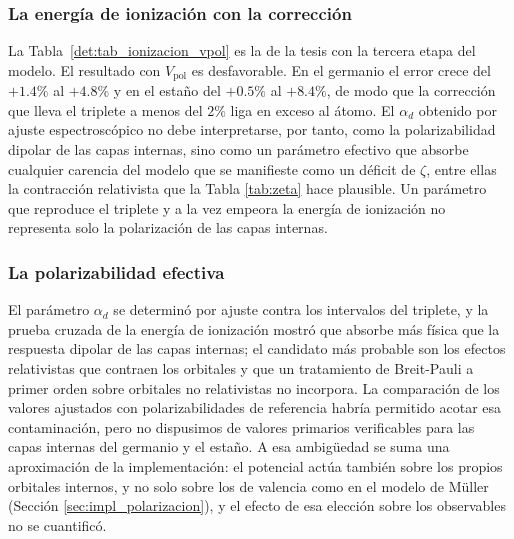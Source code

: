 \subsubsection{La energía de ionización con la corrección}

\begin{table}[htbp]
  \centering
  
  \caption{La Tabla~\ref{tab:ionizacion} de la tesis con la columna CI+$V_{\text{pol}}$, que usa el $\alpha_d$ adoptado.}
  \label{det:tab_ionizacion_vpol}
\end{table}

\begin{table}[htbp]
  \centering
  
  \caption{La Tabla~\ref{tab:lande} de la tesis con la columna CI+$V_{\text{pol}}$.}
  \label{det:tab_lande_vpol}
\end{table}

La Tabla~\ref{det:tab_ionizacion_vpol} es la de la tesis con la tercera etapa del modelo. 
El resultado con $V_{\text{pol}}$ es desfavorable. En el germanio el error crece del $+1.4\%$ al $+4.8\%$ y en el estaño del $+0.5\%$ al $+8.4\%$, de modo que la corrección que lleva el triplete a menos del $2\%$ liga en exceso al átomo. El $\alpha_d$ obtenido por ajuste espectroscópico no debe interpretarse, por tanto, como la polarizabilidad dipolar de las capas internas, sino como un parámetro efectivo que absorbe cualquier carencia del modelo que se manifieste como un déficit de $\zeta$, entre ellas la contracción relativista que la Tabla \ref{tab:zeta} hace plausible. Un parámetro que reproduce el triplete y a la vez empeora la energía de ionización no representa solo la polarización de las capas internas.

\subsubsection{La polarizabilidad efectiva}

El parámetro $\alpha_d$ se determinó por ajuste contra los intervalos del triplete, y la prueba cruzada de la energía de ionización mostró que absorbe más física que la respuesta dipolar de las capas internas; el candidato más probable son los efectos relativistas que contraen los orbitales y que un tratamiento de Breit-Pauli a primer orden sobre orbitales no relativistas no incorpora. La comparación de los valores ajustados con polarizabilidades de referencia habría permitido acotar esa contaminación, pero no dispusimos de valores primarios verificables para las capas internas del germanio y el estaño. A esa ambigüedad se suma una aproximación de la implementación: el potencial actúa también sobre los propios orbitales internos, y no solo sobre los de valencia como en el modelo de Müller (Sección \ref{sec:impl_polarizacion}), y el efecto de esa elección sobre los observables no se cuantificó.

